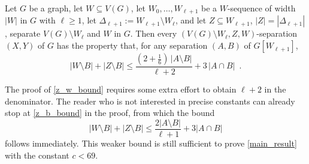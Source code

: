 \documentclass{patmorin}
\newcommand{\pat}[1]{\textcolor{Blue}{[Pat: #1]}}
\begin{document}
\begin{lem}\label{z_w_bound}
  Let $G$ be a graph, let $W\subseteq V(G)$, let $W_0,\ldots,W_{\ell+1}$ be a $W$-sequence of width $|W|$ in $G$ with $\ell\ge 1$, let $\Delta_{\ell+1}:=W_{\ell+1}\setminus W_{\ell}$,  and let $Z\subseteq W_{\ell+1}$, $|Z|=|\Delta_{\ell+1}|$, separate $V(G)\setminus W_{\ell}$ and $W$ in $G$.
  Then every $(V(G)\setminus W_{\ell},Z,W)$-separation $(X,Y)$ of $G$ has the property that, for any separation
  $(A,B)$ of $G[W_{\ell+1}]$,
  \[
    |W\setminus B|+|Z\setminus B|\le \frac{(2+\tfrac{1}{6})\,|A\setminus B|}{\ell+2}+3\,|A\cap B| \enspace .
  \]
\end{lem}


\begin{rem}\label{easier_path}
  The proof of \cref{z_w_bound} requires some extra effort to obtain $\ell+2$ in the denominator. The reader who is not interested in precise constants can already stop at \cref{z_b_bound} in the proof, from which the bound
  \[
    |W\setminus B|+|Z\setminus B|\le \frac{2|A\setminus B|}{\ell+1} + 3|A\cap B| 
  \]
  follows immediately.
  This weaker bound is still sufficient to prove \cref{main_result} with the constant $c< 69$.
\end{rem}
\end{document}

